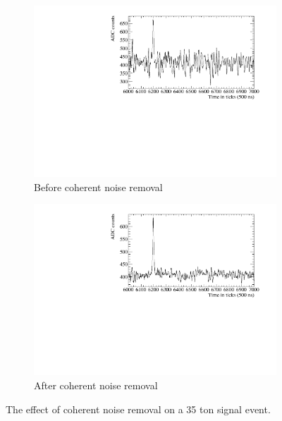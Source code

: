 \begin{figure}[h!]
  \centering
  \begin{subfigure}{0.45\textwidth}
    \centering
    \includegraphics[width=\textwidth]{BeforeCoherent}
    \caption{Before coherent noise removal}
  \end{subfigure}
  \hspace{0.08\textwidth}
  \begin{subfigure}{0.45\textwidth}
    \centering
    \includegraphics[width=\textwidth]{AfterCoherent}
    \caption{After coherent noise removal}
  \end{subfigure}
  \caption[Removing coherent noise in the 35 ton]
          {The effect of coherent noise removal on a 35 ton signal event.}
  \label{fig:CoherentNoise}
\end{figure}

